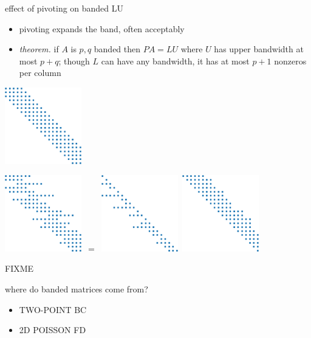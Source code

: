 \documentclass[10pt,
               svgnames,
               hyperref={colorlinks,citecolor=DeepPink4,linkcolor=FireBrick,urlcolor=Maroon},
               usepdftitle=false]{beamer}
\begin{document}
\begin{frame}{effect of pivoting on banded LU}

\begin{itemize}
\item pivoting expands the band, often acceptably
\item \emph{theorem.} if $A$ is $p,q$ banded then $PA=LU$ where $U$ has upper bandwidth at most $p+q$; though $L$ can have any bandwidth, it has at most $p+1$ nonzeros per column
\end{itemize}

\includegraphics[width=0.25\textwidth]{images/banded-A.png}

\mbox{\includegraphics[width=0.25\textwidth]{images/banded-PA.png} $=$ \includegraphics[width=0.25\textwidth]{images/banded-L.png} \includegraphics[width=0.25\textwidth]{images/banded-U.png}}

FIXME
\end{frame}


\begin{frame}{where do banded matrices come from?}

\begin{itemize}
\item TWO-POINT BC
\item 2D POISSON FD
\end{itemize}
\end{frame}
\end{document}
